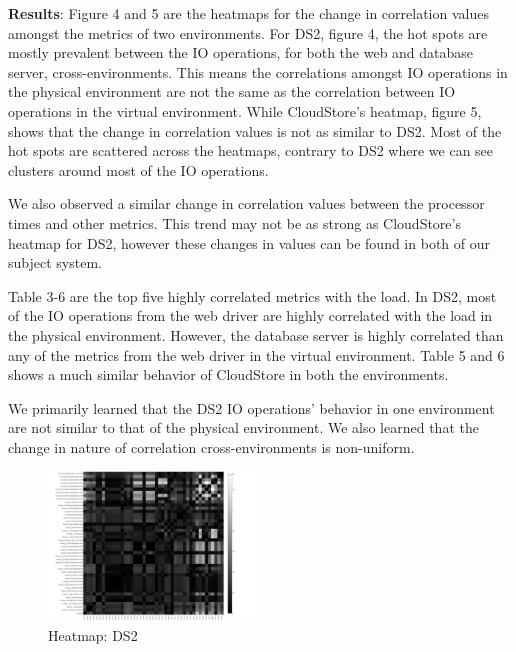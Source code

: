 \textbf{Results}: Figure 4 and 5 are the heatmaps for the change in correlation values amongst the metrics of two environments. For DS2, figure 4, the hot spots are mostly prevalent between the IO operations, for both the web and database server, cross-environments. This means the correlations amongst IO operations in the physical environment are not the same as the correlation between IO operations in the virtual environment. While CloudStore's heatmap, figure 5, shows that the change in correlation values is not as similar to DS2. Most of the hot spots are scattered across the heatmaps, contrary to DS2 where we can see clusters around most of the IO operations. 

We also observed a similar change in correlation values between the processor times and other metrics. This trend may not be as strong as CloudStore's heatmap for DS2, however these changes in values can be found in both of our subject system.

Table 3-6 are the top five highly correlated metrics with the load. In DS2, most of the IO operations from the web driver are highly correlated with the load in the physical environment. However, the database server is highly correlated than any of the metrics from the web driver in the virtual environment.
Table 5 and 6 shows a much similar behavior of CloudStore in both the environments.

We primarily learned that the DS2 IO operations' behavior in one environment are not similar to that of the physical environment. We also learned that the change in nature of correlation cross-environments is non-uniform.



\begin{figure}[tbh]
	\centering	
	\includegraphics[width=0.5\textwidth]{figures/ds2_heatmap.pdf}
	\caption{Heatmap: DS2}
	\label{fig:Results Table}
\end{figure}

